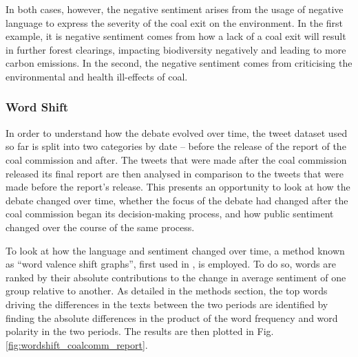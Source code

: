 \documentclass[12pt,onecolumn,twoside]{layout}
\begin{document}
In both cases, however, the negative sentiment arises from the usage of negative language to express the severity of the coal exit on the environment. In the first example, it is negative sentiment comes from how a lack of a coal exit will result in further forest clearings, impacting biodiversity negatively and leading to more carbon emissions. In the second, the negative sentiment comes from criticising the environmental and health ill-effects of coal. 

\subsubsection*{Word Shift}
In order to understand how the debate evolved over time, the tweet dataset used so far is split into two categories by date -- before the release of the report of the coal commission and after. The tweets that were made after the coal commission released its final report are then analysed in comparison to the tweets that were made before the report's release. This presents an opportunity to look at how the debate changed over time, whether the focus of the debate had changed after the coal commission began its decision-making process, and how public sentiment changed over the course of the same process. 

To look at how the language and sentiment changed over time, a method known as ``word valence shift graphs'', first used in \cite{Dodds2011}, is employed. To do so, words are ranked by their absolute contributions to the change in average sentiment of one group relative to another. As detailed in the methods section, the top words driving the differences in the texts between the two periods are identified by finding the absolute differences in the product of the word frequency and word polarity in the two periods. The results are then plotted in Fig. \ref{fig:wordshift_coalcomm_report}. 
\end{document}
